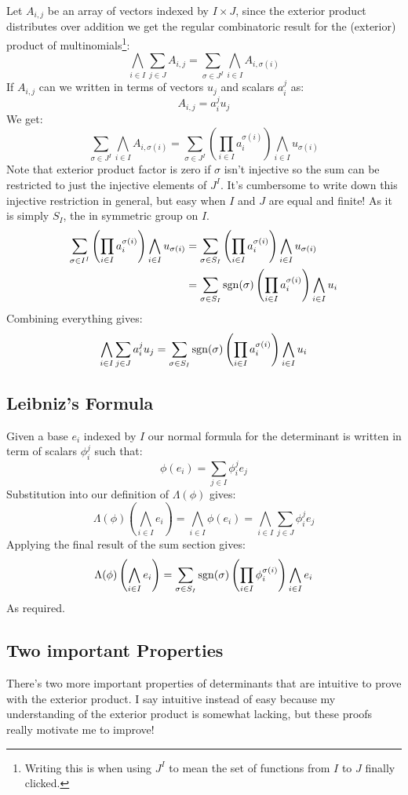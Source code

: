 Let $A_{i,j}$ be an array of vectors indexed by $I\times J$,
since the exterior product distributes over addition we get the regular combinatoric result for the (exterior) product of multinomials\footnote{Writing this is when using $J^I$ to mean the set of functions from $I$ to $J$ finally clicked.}:
\[\bigwedge_{i\in I}\sum_{j\in J} A_{i,j} = \sum_{\sigma\in J^I}\bigwedge_{i\in I}A_{i,\sigma(i)}\]
If $A_{i,j}$ can we written in terms of vectors $u_j$ and scalars $a_i^j$ as: 
\[A_{i,j} = a_i^ju_j\]
We get:
\[ \sum_{\sigma\in J^I}\bigwedge_{i\in I}A_{i,\sigma(i)} = \sum_{\sigma\in J^I}\left(\prod_{i\in I}a_i^{\sigma(i)}\right)\bigwedge_{i\in I}u_{\sigma(i)}\]
Note that exterior product factor is zero if $\sigma$ isn't injective so the sum can be restricted to just the injective elements of $J^I$.
It's cumbersome to write down this injective restriction in general,
but easy when $I$ and $J$ are equal and finite!
As it is simply $S_I$,
the in symmetric group on $I$.
\[\begin{aligned} 
	\sum_{\sigma\in I^I}\left(\prod_{i\in I}a_i^{\sigma(i)}\right)\bigwedge_{i\in I}u_{\sigma(i)}
	&= \sum_{\sigma\in S_I}\left(\prod_{i\in I}a_i^{\sigma(i)}\right)\bigwedge_{i\in I}u_{\sigma(i)}\\
	&= \sum_{\sigma\in S_I}\operatorname{sgn}(\sigma)\left(\prod_{i\in I}a_i^{\sigma(i)}\right)\bigwedge_{i\in I}u_{i}\\
\end{aligned}\]
Combining everything gives:
\[\bigwedge_{i\in I}\sum_{j\in J} a_i^ju_j= \sum_{\sigma\in S_I}\operatorname{sgn}(\sigma)\left(\prod_{i\in I}a_i^{\sigma(i)}\right)\bigwedge_{i\in I}u_{i}\]

\subsection{Leibniz's Formula}
Given a base $e_i$ indexed by $I$ our normal formula for the determinant is written in term of scalars $\phi_i^j$ such that:
\[\phi(e_i) = \sum_{j\in I}\phi_i^je_j\]
Substitution into our definition of $\Lambda(\phi)$ gives:
\[\Lambda(\phi)\left(\bigwedge_{i\in I}e_i\right) = \bigwedge_{i\in I}\phi(e_i) = \bigwedge_{i\in I}\sum_{j\in J}\phi_i^je_j\]
Applying the final result of the sum section gives:
\[\Lambda(\phi)\left(\bigwedge_{i\in I}e_i\right) = \sum_{\sigma\in S_I}\operatorname{sgn}(\sigma)\left(\prod_{i\in I}\phi_i^{\sigma(i)}\right)\bigwedge_{i\in I}e_{i} \]
As required.

\subsection{Two important Properties}
There's two more important properties of determinants that are intuitive to prove with the exterior product.
I say intuitive instead of easy because my understanding of the exterior product is somewhat lacking,
but these proofs really motivate me to improve!

